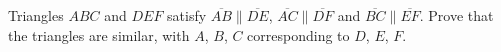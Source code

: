 Triangles $ABC$ and $DEF$ satisfy $\overline{AB}\parallel\overline{DE}$, $\overline{AC}\parallel\overline{DF}$ and $\overline{BC}\parallel\overline{EF}$. Prove that the triangles are similar, with $A$, $B$, $C$ corresponding to $D$, $E$, $F$.
